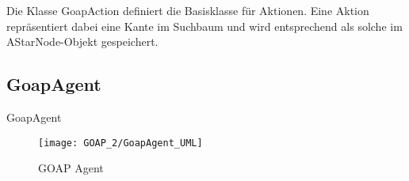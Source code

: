 Die Klasse GoapAction definiert die Basisklasse für Aktionen. Eine Aktion repräsentiert dabei eine Kante im Suchbaum und wird entsprechend als solche im AStarNode-Objekt gespeichert.

\subsection{GoapAgent}

GoapAgent

\begin{figure}[h]
  \centering
  \texttt{[image: GOAP\_2/GoapAgent\_UML]}
	\captionsetup{justification=justified, format=plain}
  \caption{GOAP Agent}
  \label{GOAP Agent}
\end{figure}